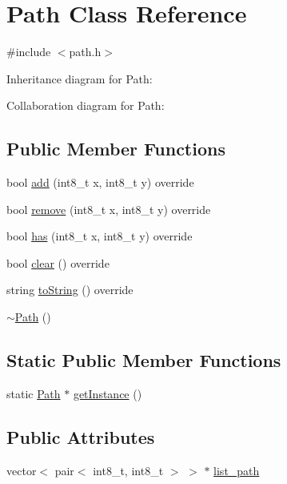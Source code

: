 \hypertarget{class_path}{\section{Path Class Reference}
\label{class_path}
}


{\ttfamily \#include $<$path.\-h$>$}



Inheritance diagram for Path\-:


Collaboration diagram for Path\-:
\subsection*{Public Member Functions}
\begin{DoxyCompactItemize}
\item 
bool \hyperlink{class_path_a0b82136bc60497245fef11070a74061b}{add} (int8\-\_\-t x, int8\-\_\-t y) override
\item 
bool \hyperlink{class_path_a9c22f1b57641acc96547bc8aa04f0fe5}{remove} (int8\-\_\-t x, int8\-\_\-t y) override
\item 
bool \hyperlink{class_path_ad2879954ff083fe85ea7e494fb7d1793}{has} (int8\-\_\-t x, int8\-\_\-t y) override
\item 
bool \hyperlink{class_path_a962e54c19be5fbe17f902ee6a7a3a706}{clear} () override
\item 
string \hyperlink{class_path_ae9094dd83cfcbe9139a41f7aabda84ce}{to\-String} () override
\item 
\hyperlink{class_path_a141da9ff89c85e0ba410b5a73864c267}{$\sim$\-Path} ()
\end{DoxyCompactItemize}
\subsection*{Static Public Member Functions}
\begin{DoxyCompactItemize}
\item 
static \hyperlink{class_path}{Path} $\ast$ \hyperlink{class_path_a183700997f2499f31dc2a533c9ace59a}{get\-Instance} ()
\end{DoxyCompactItemize}
\subsection*{Public Attributes}
\begin{DoxyCompactItemize}
\item 
vector$<$ pair$<$ int8\-\_\-t, int8\-\_\-t $>$ $>$ $\ast$ \hyperlink{class_path_a1aeccb79c82441549c27f7874f78856e}{list\-\_\-path}
\end{DoxyCompactItemize}


